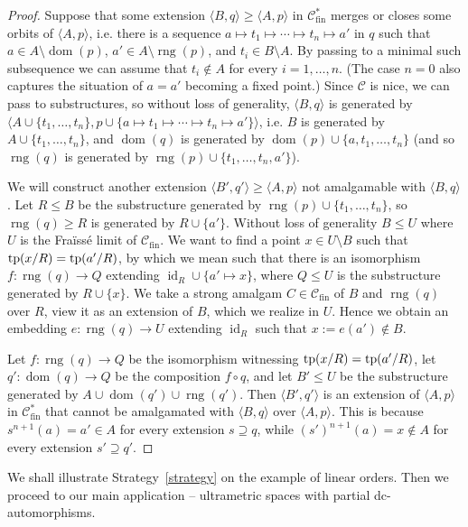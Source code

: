 \documentclass[oneside,notitlepage,12pt]{article}
\theoremstyle{definition}
\theoremstyle{remark}
\newcommand \seq [1]{\langle #1 \rangle}
\newcommand \maps {\colon} %
\newcommand \id [1]{{\operatorname{id}_{#1}}}
\newcommand \dom {\operatorname{dom}}
\newcommand \rng {\operatorname{rng}}
\newcommand \cmp {\circ} %
\newcommand \C {\mathscr{C}}
\newcommand \fin {{\operatorname{fin}}}
\newcommand \tp {{\rm{tp}}}
\begin{document}
\begin{proof}
    Suppose that some extension $\seq{B, q} \geq \seq{A, p}$ in $\C^*_\fin$ merges or closes some orbits of $\seq{A, p}$, i.e. there is a sequence $a \mapsto t_1 \mapsto \cdots \mapsto t_n \mapsto a'$ in $q$ such that $a \in A \setminus \dom(p)$, $a' \in A \setminus \rng(p)$, and $t_i \in B \setminus A$.
    By passing to a minimal such subsequence we can assume that $t_i \notin A$ for every $i = 1, \ldots, n$.
    (The case $n = 0$ also captures the situation of $a = a'$ becoming a fixed point.)
    Since $\C$ is nice, we can pass to substructures, so without loss of generality, $\seq{B, q}$ is generated by $\seq{A \cup \{t_1, \ldots, t_n\}, p \cup \{a \mapsto t_1 \mapsto \cdots \mapsto t_n \mapsto a'\}}$, i.e. $B$ is generated by $A \cup \{t_1, \ldots, t_n\}$, and $\dom(q)$ is generated by $\dom(p) \cup \{a, t_1, \ldots, t_n\}$ (and so  $\rng(q)$ is generated by $\rng(p) \cup \{t_1, \ldots, t_n, a'\}$).

    We will construct another extension $\seq{B', q'} \geq \seq{A, p}$ not amalgamable with $\seq{B, q}$.
    Let $R \leq B$ be the substructure generated by $\rng(p) \cup \{t_1, \ldots, t_n\}$, so $\rng(q) \geq R$ is generated by $R \cup \{a'\}$.
    Without loss of generality $B\leq U$ where $U$ is the Fraïssé limit of $\C_\fin$.
    We want to find a point $x \in U \setminus B$ such that $\tp(x/R) = \tp(a'/R)$, by which we mean such that there is an isomorphism $f\maps\rng(q) \to Q$ extending $\id{R} \cup \{a' \mapsto x\}$, where $Q \leq U$ is the substructure generated by $R \cup \{x\}$.
    We take a strong amalgam $C \in \C_\fin$ of $B$ and $\rng(q)$ over $R$, view it as an extension of $B$, which we realize in $U$.
    Hence we obtain an embedding $e\maps\rng(q) \to U$ extending $\id{R}$ such that $x := e(a') \notin B$.
    
    Let $f\maps \rng(q) \to Q$ be the isomorphism witnessing $\tp(x/R) = \tp(a'/R)$, let $q'\maps \dom(q) \to Q$ be the composition $f \cmp q$, and let $B' \leq U$ be the substructure generated by $A \cup \dom(q') \cup \rng(q')$.
    Then $\seq{B', q'}$ is an extension of $\seq{A, p}$ in $\C^*_\fin$ that cannot be amalgamated with $\seq{B, q}$ over $\seq{A, p}$.
    This is because $s^{n + 1}(a) =a' \in A$ for every extension $s \supseteq q$, while $(s')^{n+1}(a)=x \not \in A$ for every extension $s' \supseteq q'$.
\end{proof}

We shall illustrate Strategy~\ref{strategy} on the example of linear orders.
Then we proceed to our main application – ultrametric spaces with partial dc-automorphisms.
\end{document}
